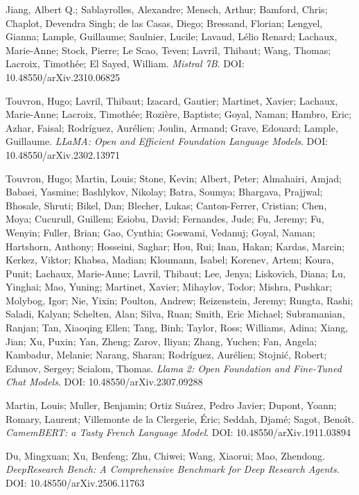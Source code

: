 \documentclass[12pt]{article}
\begin{document}
\begin{thebibliography}{9}
Jiang, Albert Q.; Sablayrolles, Alexandre; Mensch, Arthur; Bamford, Chris; Chaplot, Devendra Singh; de las Casas, Diego; Bressand, Florian; Lengyel, Gianna; Lample, Guillaume; Saulnier, Lucile; Lavaud, Lélio Renard; Lachaux, Marie-Anne; Stock, Pierre; Le Scao, Teven; Lavril, Thibaut; Wang, Thomas; Lacroix, Timothée; El Sayed, William.
\textit{Mistral 7B}.
DOI: 10.48550/arXiv.2310.06825

Touvron, Hugo; Lavril, Thibaut; Izacard, Gautier; Martinet, Xavier; Lachaux, Marie-Anne; Lacroix, Timothée; Rozière, Baptiste; Goyal, Naman; Hambro, Eric; Azhar, Faisal; Rodríguez, Aurélien; Joulin, Armand; Grave, Edouard; Lample, Guillaume.  
\textit{LLaMA: Open and Efficient Foundation Language Models}.  
DOI: 10.48550/arXiv.2302.13971  

Touvron, Hugo; Martin, Louis; Stone, Kevin; Albert, Peter; Almahairi, Amjad; Babaei, Yasmine; Bashlykov, Nikolay; Batra, Soumya; Bhargava, Prajjwal; Bhosale, Shruti; Bikel, Dan; Blecher, Lukas; Canton-Ferrer, Cristian; Chen, Moya; Cucurull, Guillem; Esiobu, David; Fernandes, Jude; Fu, Jeremy; Fu, Wenyin; Fuller, Brian; Gao, Cynthia; Goswami, Vedanuj; Goyal, Naman; Hartshorn, Anthony; Hosseini, Saghar; Hou, Rui; Inan, Hakan; Kardas, Marcin; Kerkez, Viktor; Khabsa, Madian; Kloumann, Isabel; Korenev, Artem; Koura, Punit; Lachaux, Marie-Anne; Lavril, Thibaut; Lee, Jenya; Liskovich, Diana; Lu, Yinghai; Mao, Yuning; Martinet, Xavier; Mihaylov, Todor; Mishra, Pushkar; Molybog, Igor; Nie, Yixin; Poulton, Andrew; Reizenstein, Jeremy; Rungta, Rashi; Saladi, Kalyan; Schelten, Alan; Silva, Ruan; Smith, Eric Michael; Subramanian, Ranjan; Tan, Xiaoqing Ellen; Tang, Binh; Taylor, Ross; Williams, Adina; Xiang, Jian; Xu, Puxin; Yan, Zheng; Zarov, Iliyan; Zhang, Yuchen; Fan, Angela; Kambadur, Melanie; Narang, Sharan; Rodríguez, Aurélien; Stojnić, Robert; Edunov, Sergey; Scialom, Thomas.  
\textit{Llama 2: Open Foundation and Fine-Tuned Chat Models}.  
DOI: 10.48550/arXiv.2307.09288  

Martin, Louis; Muller, Benjamin; Ortiz Suárez, Pedro Javier; Dupont, Yoann; Romary, Laurent; Villemonte de la Clergerie, Éric; Seddah, Djamé; Sagot, Benoît.  
\textit{CamemBERT: a Tasty French Language Model}.  
DOI: 10.48550/arXiv.1911.03894  

Du, Mingxuan; Xu, Benfeng; Zhu, Chiwei; Wang, Xiaorui; Mao, Zhendong.  
\textit{DeepResearch Bench: A Comprehensive Benchmark for Deep Research Agents}.  
DOI: 10.48550/arXiv.2506.11763  


\end{thebibliography}
\end{document}
